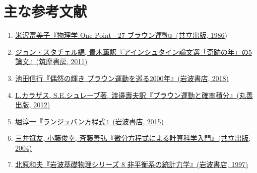 \documentclass[a4paper,10.5pt]{jsarticle}
\begin{document}
  \section*{主な参考文献}
    \begin{enumerate}
      \item {\href{https://www.kyoritsu-pub.co.jp/bookdetail/9784320032361}{米沢富美子『物理学 One Point - 27 ブラウン運動』(共立出版, 1986)}}
      \item {\href{https://www.chikumashobo.co.jp/product/9784480094032/}{ジョン・スタチェル編, 青木薫訳『アインシュタイン論文選「奇跡の年」の5論文』(筑摩書房, 2011)}} %
      \item {\href{https://www.iwanami.co.jp/book/b427307.html}{池田信行『偶然の輝き ブラウン運動を巡る2000年』(岩波書店, 2018)}} %
      \item{\href{https://www.maruzen-publishing.co.jp/item/?book_no=294581}{L.カラザス, S.E.シュレーブ著, 渡邉壽夫訳『ブラウン運動と確率積分』(丸善出版, 2012)}} %
      \item{\href{https://www.iwanami.co.jp/book/b266718.html}{堀淳一『ランジュバン方程式』(岩波書店, 2015)}} %
      \item{\href{https://www.kyoritsu-pub.co.jp/bookdetail/9784320017535}{三井斌友, 小藤俊幸, 斉藤善弘『微分方程式による計算科学入門』(共立出版, 2004)}} %
      \item{\href{https://www.iwanami.co.jp/book/b258377.html}{北原和夫『岩波基礎物理シリーズ 8 非平衡系の統計力学』(岩波書店, 1997)}} %
    \end{enumerate}
\end{document}
